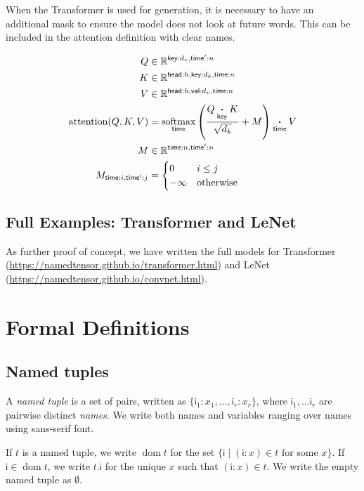 \documentclass{article}
\newcommand{\name}[1]{\mathsf{#1}}
\newcommand{\ndot}[1]{\mathbin{\mathop{\thinspace\boldsymbol\cdot\thinspace}\limits_{\name{#1}}}}
\newcommand{\nfun}[2]{\mathop{\text{#2}}\limits_{\name{#1}}}
\newcommand{\tuple}[1]{\{ #1\}}
\DeclareMathOperator{\tupledom}{dom}
\newcommand{\tupleproj}[2]{#1.#2}
\newcommand{\reals}{\mathbb{R}}
\begin{document}
When the Transformer is used for generation, it is necessary to have
an additional mask to ensure the model does not look at future words.
This can be included in the attention definition with clear names.

\begin{align*} 
Q &\in \reals^{\name{key}:d_v,\name{time'}:n}\\
K &\in \reals^{\name{head}:h,\name{key}:d_k, \name{time}:n}\\
V &\in \reals^{\name{head}:h, \name{val}:d_v, \name{time}:n}\\
\text{attention}(Q, K, V) &=  \nfun{time}{softmax} \left( \frac{Q \ndot{key} K }{\sqrt{d_k}} + M \right) \ndot{time} V \\
M & \in \reals^{\name{time}:n, \name{time'}:n} \\
M_{\name{time}:i, \name{time'}:j} & = \begin{cases}0 & i \leq j\\
-\infty & \text{otherwise} \end{cases} \\
\end{align*}


\subsection{Full Examples: Transformer and LeNet}

As further proof of concept, we have written the full models for Transformer (\url{https://namedtensor.github.io/transformer.html}) and LeNet (\url{https://namedtensor.github.io/convnet.html}). 

\section{Formal Definitions}
\label{sec:definitions}

\subsection{Named tuples}

A \emph{named tuple} is a set of pairs, written as $\tuple{\name{i}_1: x_1, \ldots, \name{i}_r: x_r}$, where $\name{i}_1, \ldots \name{i}_r$ are pairwise distinct \emph{names}. We write both names and variables ranging over names using sans-serif font.

If $t$ is a named tuple, we write $\tupledom{t}$ for the set $\{ \name{i} \mid \text{$(\name{i}:x) \in t$ for some $x$} \}$. If $\name{i} \in \tupledom{t}$, we write $\tupleproj{t}{\name{i}}$ for the unique $x$ such that $(\name{i}:x) \in t$. We write the empty named tuple as $\emptyset$.
\end{document}
